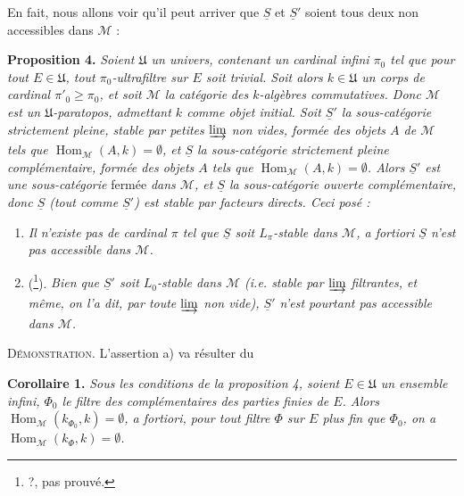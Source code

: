 En fait, nous allons voir qu'il peut arriver que $\underline{S}$ et $\underline{S}'$ soient tous deux non accessibles dans $\mathcal{M}$ :

\textbf{Proposition 4.} \textit{Soient $\mathfrak{U}$ un univers, contenant un cardinal infini $\pi_0$ tel que pour tout $E\in\mathfrak{U}$, tout $\pi_0$-ultrafiltre sur $E$ soit trivial. Soit alors $k\in\mathfrak{U}$ un corps de cardinal $\pi'_0\geqslant\pi_0$, et soit $\mathcal{M}$ la catégorie}
\textit{des $k$-algèbres commutatives. Donc $\mathcal{M}$ est un $\mathfrak{U}$-paratopos, admettant $k$ comme objet initial. Soit $\underline{S}'$ la sous-catégorie strictement pleine, stable par petites $\mathop{\underrightarrow{\mathrm{lim}}}$ non vides, formée des objets $A$ de $\mathcal{M}$ tels que $\operatorname{Hom}_{\mathcal{M}}(A,k)=\emptyset$, et $\underline{S}$ la sous-catégorie strictement pleine complémentaire, formée des objets $A$ tels que $\operatorname{Hom}_{\mathcal{M}}(A,k)=\emptyset$. Alors $\underline{S}'$ est une sous-catégorie} fermée \textit{dans $\mathcal{M}$, et $\underline{S}$ la sous-catégorie ouverte complémentaire, donc $\underline{S}$ (tout comme $\underline{S}'$) est stable par facteurs directs. Ceci posé :} %
\begin{enumerate}[label={}]
\item[\textit{a)}] \textit{Il n'existe pas de cardinal $\pi$ tel que $\underline{S}$ soit $L_\pi$-stable dans $\mathcal{M}$, a fortiori $\underline{S}$ n'est pas accessible dans $\mathcal{M}$.}
\item[\textit{b)}] (\footnote[207]{?, pas prouvé.}). \textit{Bien que $\underline{S}'$ soit $L_0$-stable dans $\mathcal{M}$ (i.e. stable par $\mathop{\underrightarrow{\mathrm{lim}}}$ filtrantes, et même, on l'a dit, par toute $\mathop{\underrightarrow{\mathrm{lim}}}$ non vide), $\underline{S}'$ n'est pourtant pas accessible dans $\mathcal{M}$.}
\end{enumerate}
\noindent\textsc{Démonstration}. L'assertion a) va résulter du

\textbf{Corollaire 1.} \textit{Sous les conditions de la proposition 4, soient $E\in\mathfrak{U}$ un ensemble infini, $\Phi_0$ le filtre des complémentaires des parties finies de $E$. Alors $\operatorname{Hom}_{\mathcal{M}}(k_{\Phi_0},k)=\emptyset$, a fortiori, pour tout filtre $\Phi$ sur $E$ plus fin que $\Phi_0$, on a $\operatorname{Hom}_{\mathcal{M}}(k_\Phi,k)=\emptyset$.}

